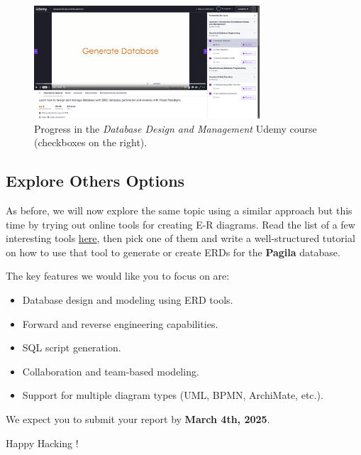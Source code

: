 \documentclass{article}
\begin{document}
\begin{figure}[t]
    \centering
    \includegraphics[width=0.75\textwidth]{figures/progress}
    \caption{Progress in the \textit{Database Design and Management} Udemy course (checkboxes on the right).}
    \label{fig:progress}
\end{figure}

\subsection{Explore Others Options}
As before, we will now explore the same topic using a similar approach but this time by trying out online tools for creating E-R diagrams. Read the list of a few interesting tools \href{https://drive.google.com/file/d/1FEkgTJEXY07AtVxIYr1_qq0naw3rmOpu/view?usp=sharing}{here}, then pick one of them and write a well-structured tutorial on how to use that tool to generate or create ERDs for the \textbf{Pagila} database.

The key features we would like you to focus on are:

\begin{itemize}
    \item Database design and modeling using ERD tools.
    \item Forward and reverse engineering capabilities.
    \item SQL script generation.
    \item Collaboration and team-based modeling.
    \item Support for multiple diagram types (UML, BPMN, ArchiMate, etc.).
\end{itemize}

We expect you to submit your report by \textbf{March 4th, 2025}.

\vspace{5mm}
Happy Hacking \smiley!
\end{document}
